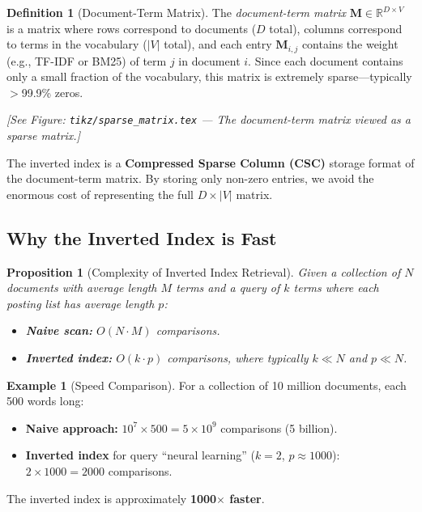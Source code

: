 \documentclass[aspectratio=169]{beamer} \usetheme{TUDelft} %
\theoremstyle{definition}
\newtheorem{definition}{Definition}[section]
\newtheorem{example}{Example}[section]
\theoremstyle{plain}
\newtheorem{proposition}[theorem]{Proposition}
\begin{document}
\begin{definition}[Document-Term Matrix]
\label{def:doc-term-matrix}
The \emph{document-term matrix} $\mathbf{M} \in \mathbb{R}^{D \times V}$ is a matrix where rows correspond to documents ($D$ total), columns correspond to terms in the vocabulary ($|V|$ total), and each entry $\mathbf{M}_{i,j}$ contains the weight (e.g., TF-IDF or BM25) of term $j$ in document $i$. Since each document contains only a small fraction of the vocabulary, this matrix is extremely sparse---typically $>$99.9\% zeros.
\end{definition}

\begin{center}
\textit{[See Figure: \texttt{tikz/sparse\_matrix.tex} --- The document-term matrix viewed as a sparse matrix.]}
\end{center}

\begin{keytakeaway}
The inverted index is a \textbf{Compressed Sparse Column (CSC)} storage format of the document-term matrix. By storing only non-zero entries, we avoid the enormous cost of representing the full $D \times |V|$ matrix.
\end{keytakeaway}


\subsection{Why the Inverted Index is Fast}

\begin{proposition}[Complexity of Inverted Index Retrieval]
Given a collection of $N$ documents with average length $M$ terms and a query of $k$ terms where each posting list has average length $p$:
\begin{itemize}
    \item \textbf{Naive scan:} $O(N \cdot M)$ comparisons.
    \item \textbf{Inverted index:} $O(k \cdot p)$ comparisons, where typically $k \ll N$ and $p \ll N$.
\end{itemize}
\end{proposition}

\begin{example}[Speed Comparison]
\label{ex:speed}
For a collection of 10 million documents, each 500 words long:
\begin{itemize}
    \item \textbf{Naive approach:} $10^7 \times 500 = 5 \times 10^9$ comparisons (5 billion).
    \item \textbf{Inverted index} for query ``neural learning'' ($k = 2$, $p \approx 1000$): $2 \times 1000 = 2000$ comparisons.
\end{itemize}
The inverted index is approximately \textbf{1000$\times$ faster}.
\end{example}
\end{document}
